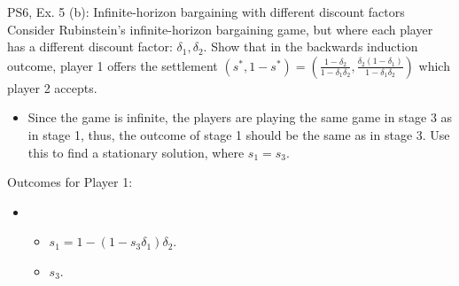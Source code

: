 \begin{frame}{PS6, Ex. 5 (b): Infinite-horizon bargaining with different discount factors}
    Consider Rubinstein's infinite-horizon bargaining game, but where each player has a different discount factor: $\delta_1,\delta_2$. Show that in the backwards induction outcome, player 1 offers the settlement
    $(s^{*},1-s^{*})=\left( \frac{1-\delta_2}{1-\delta_1\delta_2},\frac{\delta_2(1-\delta_1)}{1-\delta_1\delta_2}\right)$
    which player 2 accepts.
    \begin{itemize}
      \item[(Step b)] Since the game is infinite, the players are playing the same game in stage 3 as in stage 1, thus, the outcome of stage 1 should be the same as in stage 3. Use this to find a stationary solution, where $s_{1}=s_{3}$.
    \end{itemize}
  \begin{multicols}{2}
    \vfill\null \columnbreak
    Outcomes for Player 1:
    \begin{itemize}
        \item[]\vspace{-8pt}
            \begin{itemize}\normalsize
              \item[Stage 1:] $s_1 = 1-(1-s_3\delta_1)\delta_2$.
              \item[Stage 3:] $s_3$.
            \end{itemize}
    \end{itemize}
    \vfill\null
  \end{multicols}
    \vfill\null
\end{frame}
